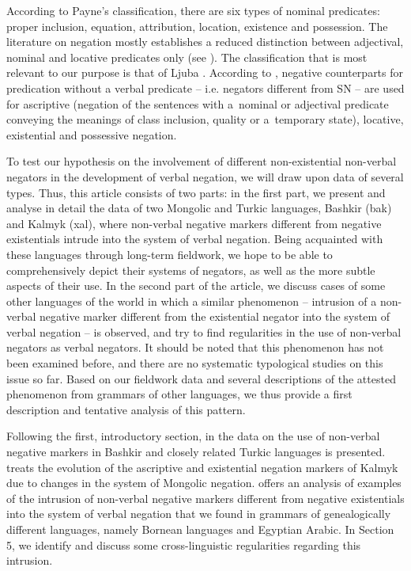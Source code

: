 \documentclass[output=paper]{langsci/langscibook}
\begin{document}
According to Payne’s \citeyearpar{Payne1997} classification, there are six types of nominal predicates: proper inclusion, equation, attribution, location, existence and possession. The literature on negation mostly establishes a reduced distinction between adjectival, nominal and locative predicates only (see \citealp{dryer2007a}). The classification that is most relevant to our purpose is that of Ljuba \citet{Veselinova2015}. According to \citet[550]{Veselinova2015}, negative counterparts for predication without a verbal predicate – i.e. negators different from SN – are used for ascriptive (negation of the sentences with a nominal or adjectival predicate conveying the meanings of class inclusion, quality or a temporary state), locative, existential and possessive negation.

To test our hypothesis on the involvement of different non-existential non-verbal negators in the development of verbal negation, we will draw upon data of several types. Thus, this article consists of two parts: in the first part, we present and analyse in detail the data of two Mongolic and Turkic languages, Bashkir (bak) and Kalmyk (xal), where non-verbal negative markers different from negative existentials intrude into the system of verbal negation. Being acquainted with these languages through long-term fieldwork, we hope to be able to comprehensively depict their systems of negators, as well as the more subtle aspects of their use. In the second part of the article, we discuss cases of some other languages of the world in which a similar phenomenon – intrusion of a non-verbal negative marker different from the existential negator into the system of verbal negation – is observed, and try to find regularities in the use of non-verbal negators as verbal negators. It should be noted that this phenomenon has not been examined before, and there are no systematic typological studies on this issue so far. Based on our fieldwork data and several descriptions of the attested phenomenon from grammars of other languages, we thus provide a first description and tentative analysis of this pattern.

Following the first, introductory section, in  the data on the use of non-verbal negative markers in Bashkir and closely related Turkic languages is presented.  treats the evolution of the ascriptive and existential negation markers of Kalmyk due to changes in the system of Mongolic negation.  offers an analysis of examples of the intrusion of non-verbal negative markers different from negative existentials into the system of verbal negation that we found in grammars of genealogically different languages, namely Bornean languages and Egyptian Arabic. In Section 5, we identify and discuss some cross-linguistic regularities regarding this intrusion.
\end{document}
